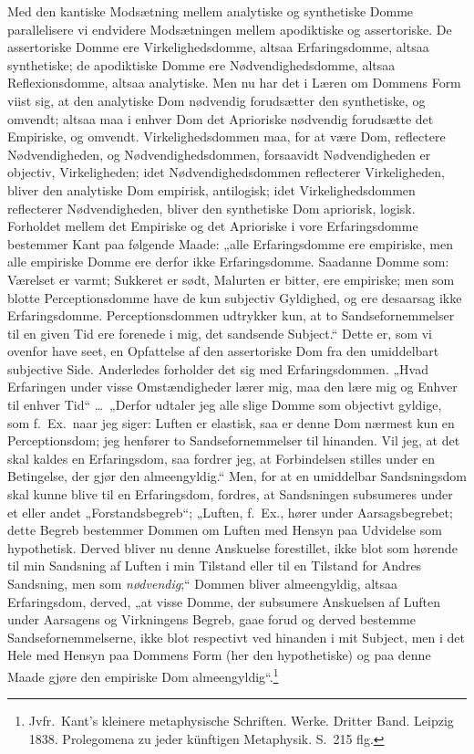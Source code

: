 \documentclass[12pt]{book}
\newcommand{\opage}[1]{\marginnote{\footnotesize\textit{[#1]}}}
\begin{document}
\opage{267}Med den kantiske Modsætning mellem analytiske og synthetiske Domme parallelisere vi endvidere Modsætningen mellem apodiktiske og assertoriske. De assertoriske Domme ere Virkelighedsdomme, altsaa Erfaringsdomme, altsaa synthetiske; de apodiktiske Domme ere Nødvendighedsdomme, altsaa Reflexionsdomme, altsaa analytiske. Men nu har det i Læren om Dommens Form viist sig, at den analytiske Dom nødvendig forudsætter den synthetiske, og omvendt; altsaa maa i enhver Dom det Aprioriske nødvendig forudsætte det Empiriske, og omvendt. Virkelighedsdommen maa, for at være Dom, reflectere Nødvendigheden, og Nødvendighedsdommen, forsaavidt Nødvendigheden er objectiv, Virkeligheden; idet Nødvendighedsdommen reflecterer Virkeligheden, bliver den analytiske Dom empirisk, antilogisk; idet Virkelighedsdommen reflecterer
\opage{268}Nødvendigheden, bliver den synthetiske Dom apriorisk, logisk. Forholdet mellem det Empiriske og det Aprioriske i vore Erfaringsdomme bestemmer Kant paa følgende Maade: „alle Erfaringsdomme ere empiriske, men alle empiriske Domme ere derfor ikke Erfaringsdomme. Saadanne Domme som: Værelset er varmt; Sukkeret er sødt, Malurten er bitter, ere empiriske; men som blotte Perceptionsdomme have de kun subjectiv Gyldighed, og ere desaarsag ikke Erfaringsdomme. Perceptionsdommen udtrykker kun, at to Sandsefornemmelser til en given Tid ere forenede i mig, det sandsende Subject.“ Dette er, som vi ovenfor have seet, en Opfattelse af den assertoriske Dom fra den umiddelbart subjective Side. Anderledes forholder det sig med Erfaringsdommen. „Hvad Erfaringen under visse Omstændigheder lærer mig, maa den lære mig og Enhver til enhver Tid“ \dots\ „Derfor udtaler jeg alle slige Domme som objectivt gyldige, som f.\ Ex.\ naar jeg siger: Luften er elastisk, saa er denne Dom nærmest kun en Perceptionsdom; jeg henfører to Sandsefornemmelser til hinanden. Vil jeg, at det skal kaldes en Erfaringsdom, saa fordrer jeg, at Forbindelsen stilles under en Betingelse, der gjør den almeengyldig.“ Men, for at en umiddelbar Sandsningsdom skal kunne blive til en Erfaringsdom, fordres, at Sandsningen subsumeres under et eller andet „Forstandsbegreb“; „Luften, f.\ Ex., hører under Aarsagsbegrebet; dette Begreb bestemmer Dommen om Luften med Hensyn paa Udvidelse som hypothetisk. Derved bliver nu denne Anskuelse forestillet, ikke blot som hørende til min Sandsning af Luften i min Tilstand eller til en Tilstand for Andres Sandsning, men som \emph{nødvendig};“ Dommen bliver almeengyldig, altsaa Erfaringsdom, derved, „at visse Domme, der subsumere Anskuelsen af Luften under Aarsagens og Virkningens Begreb, gaae forud og derved bestemme Sandsefornemmelserne, ikke blot respectivt ved hinanden i mit Subject, men i det Hele med Hensyn
\opage{269}paa Dommens Form (her den hypothetiske) og paa denne Maade gjøre den empiriske Dom almeengyldig“.\footnote{Jvfr.\ Kant's kleinere metaphysische Schriften. Werke. Dritter Band. Leipzig 1838. Prolegomena zu jeder künftigen Metaphysik. S.~215 flg.}%
\end{document}
